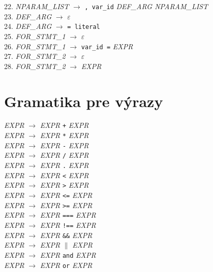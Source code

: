 \documentclass[12pt,a4paper,titlepage,final]{article}
\begin{document}
22. \textit{NPARAM\_LIST} $\rightarrow$ \texttt{, var\_id} \textit{DEF\_ARG NPARAM\_LIST}\\
23. \textit{DEF\_ARG} $\rightarrow$ $\varepsilon$\\
24. \textit{DEF\_ARG} $\rightarrow$ \texttt{= literal}\\
25. \textit{FOR\_STMT\_1} $\rightarrow$ $\varepsilon$\\
26. \textit{FOR\_STMT\_1} $\rightarrow$ \texttt{var\_id =} \textit{EXPR}\\
27. \textit{FOR\_STMT\_2} $\rightarrow$ $\varepsilon$\\
28. \textit{FOR\_STMT\_2} $\rightarrow$ \textit{EXPR}\\
\newpage
\section{Gramatika pre výrazy}
 \textit{EXPR} $\rightarrow$ \textit{EXPR} \texttt{+} \textit{EXPR} \\
 \textit{EXPR} $\rightarrow$ \textit{EXPR} \texttt{*} \textit{EXPR} \\
 \textit{EXPR} $\rightarrow$ \textit{EXPR} \texttt{-} \textit{EXPR} \\
 \textit{EXPR} $\rightarrow$ \textit{EXPR} \texttt{/} \textit{EXPR} \\
 \textit{EXPR} $\rightarrow$ \textit{EXPR} \texttt{.} \textit{EXPR} \\
 \textit{EXPR} $\rightarrow$ \textit{EXPR} \texttt{<} \textit{EXPR} \\
 \textit{EXPR} $\rightarrow$ \textit{EXPR} \texttt{>} \textit{EXPR} \\
 \textit{EXPR} $\rightarrow$ \textit{EXPR} \texttt{<=} \textit{EXPR} \\
 \textit{EXPR} $\rightarrow$ \textit{EXPR} \texttt{>=} \textit{EXPR} \\
 \textit{EXPR} $\rightarrow$ \textit{EXPR} \texttt{===} \textit{EXPR} \\
 \textit{EXPR} $\rightarrow$ \textit{EXPR} \texttt{!==} \textit{EXPR} \\
 \textit{EXPR} $\rightarrow$ \textit{EXPR} \texttt{\&\&} \textit{EXPR} \\
 \textit{EXPR} $\rightarrow$ \textit{EXPR} \texttt{$\|$} \textit{EXPR} \\
 \textit{EXPR} $\rightarrow$ \textit{EXPR} \texttt{and} \textit{EXPR} \\
 \textit{EXPR} $\rightarrow$ \textit{EXPR} \texttt{or} \textit{EXPR} \\
\end{document}
